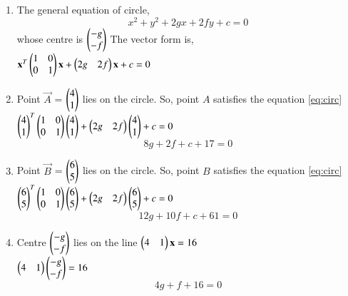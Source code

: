 \renewcommand{\theequation}{\theenumi}
\begin{enumerate}[label=\arabic*.,ref=\thesubsection.\theenumi]
\item The general equation of circle, 
\begin{equation} \label{eq:circ}
x^2+y^2+2gx+2fy+c=0
\end{equation}
whose centre is $\begin{pmatrix}-g\\-f\end{pmatrix}$
The vector form is, \\
$\mathbf{x}^T\begin{pmatrix}1&0\\0&1\end{pmatrix}\mathbf{x}+\begin{pmatrix}2g&2f\end{pmatrix}\mathbf{x}+c=0$


\item Point $\vec{A}$ = $\begin{pmatrix}4\\1\end{pmatrix}$ lies on the circle. So, point $A$ satisfies the equation \ref{eq:circ} \\
$\mathbf{\begin{pmatrix}4\\1\end{pmatrix}}^T\begin{pmatrix}1&0\\0&1\end{pmatrix}\mathbf{\begin{pmatrix}4\\1\end{pmatrix}}+\begin{pmatrix}2g&2f\end{pmatrix}\mathbf{\begin{pmatrix}4\\1\end{pmatrix}}+c=0$ \\
\begin{equation} \label{eq:circ_1}
8g+2f+c+17=0
\end{equation}

\item Point $\vec{B}$ = $\begin{pmatrix}6\\5\end{pmatrix}$ lies on the circle. So, point $B$ satisfies the equation \ref{eq:circ} \\
$\mathbf{\begin{pmatrix}6\\5\end{pmatrix}}^T\begin{pmatrix}1&0\\0&1\end{pmatrix}\mathbf{\begin{pmatrix}6\\5\end{pmatrix}}+\begin{pmatrix}2g&2f\end{pmatrix}\mathbf{\begin{pmatrix}6\\5\end{pmatrix}}+c=0$ \\
\begin{equation} \label{eq:circ_2}
12g+10f+c+61=0
\end{equation}

\item  Centre $\begin{pmatrix}-g\\-f\end{pmatrix}$ lies on the line $\begin{pmatrix}4&1\end{pmatrix}\mathbf{x}=16$ \\
$\begin{pmatrix}4&1\end{pmatrix}\mathbf{\begin{pmatrix}-g\\-f\end{pmatrix}}=16$ \\
\begin{equation} \label{eq:circ_3}
4g+f+16=0
\end{equation}


\end{enumerate}
